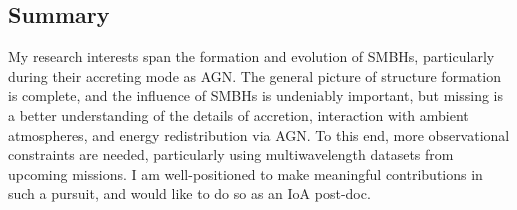 \documentclass[12pt]{article}
\begin{document}
\subsection*{Summary}
My research interests span the formation and evolution of SMBHs,
particularly during their accreting mode as AGN. The general picture
of structure formation is complete, and the influence of SMBHs is
undeniably important, but missing is a better understanding of the
details of accretion, interaction with ambient atmospheres, and energy
redistribution via AGN. To this end, more observational constraints
are needed, particularly using multiwavelength datasets from upcoming
missions. I am well-positioned to make meaningful contributions in
such a pursuit, and would like to do so as an IoA post-doc.

\scriptsize


 
\end{document}
